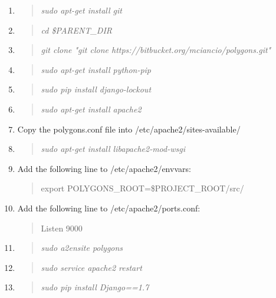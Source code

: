 \documentclass[12pt]{article}
\newenvironment{command}
   { 
      \begin{quote}\itshape
      \color{blue}
   }
   { \end{quote} }
\newenvironment{data}
   { 
      \begin{quote}\itshape
      \color{red}
   }
   { \end{quote} }
\begin{document}
\begin{enumerate}
   \item \begin{command} sudo apt-get install git \end{command}
   \item \begin{command} cd \$PARENT\_DIR \end{command}
   \item \begin{command} git clone "git clone
         https://bitbucket.org/mciancio/polygons.git" \end{command}
   \item \begin{command} sudo apt-get install python-pip \end{command}
   \item \begin{command} sudo pip install django-lockout \end{command}
   \item \begin{command} sudo apt-get install apache2 \end{command}
   \item Copy the polygons.conf file into /etc/apache2/sites-available/
   \item \begin{command} sudo apt-get install libapache2-mod-wsgi \end{command}
   \item Add the following line to /etc/apache2/envvars:
         \begin{data}
         export POLYGONS\_ROOT=\$PROJECT\_ROOT/src/
         \end{data}
   \item Add the following line to /etc/apache2/ports.conf:
         \begin{data}
         Listen 9000
         \end{data}
   \item \begin{command} sudo a2ensite polygons \end{command}
   \item \begin{command} sudo service apache2 restart \end{command}
   \item \begin{command} sudo pip install Django==1.7 \end{command}

\end{enumerate}
\end{document}
